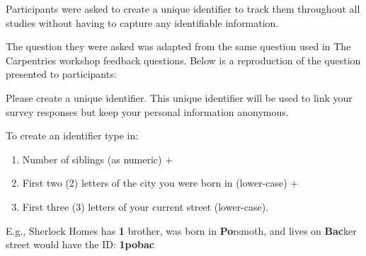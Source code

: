 \documentclass[../main.tex]{subfiles}
\begin{document}
Participants were asked to create a unique identifier to track them throughout all studies without
having to capture any identifiable information.

The question they were asked was adapted from the same question used in The Carpentries
workshop feedback questions. %
Below is a reproduction of the question presented to participants:

\begin{displayquote}
    Please create a unique identifier.
    This unique identifier will be used to link your survey responses but keep your personal information anonymous.

    To create an identifier type in:
    \begin{enumerate}
        \item Number of siblings (as numeric) +
        \item First two (2) letters of the city you were born in (lower-case) +
        \item First three (3) letters of your current street (lower-case).
    \end{enumerate}

    E.g., Sherlock Homes has \textbf{1} brother,
    was born in \textbf{Po}rsmoth,
    and lives on \textbf{Bac}ker street would have the ID: \textbf{1pobac}
\end{displayquote}
\end{document}
